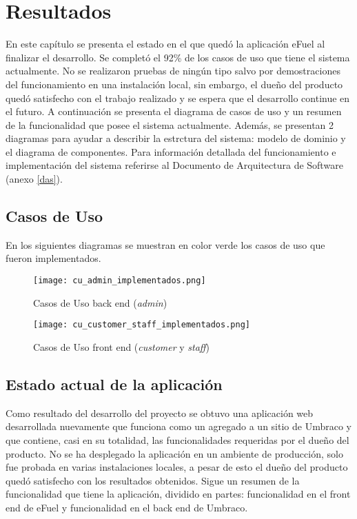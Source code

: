 \chapter{Resultados} \label{results}
En este capítulo se presenta el estado en el que quedó la aplicación eFuel al finalizar el desarrollo. Se completó el 92\% de los casos de uso que tiene el sistema actualmente. No se realizaron pruebas de ningún tipo salvo por demostraciones del funcionamiento en una instalación local, sin embargo, el dueño del producto quedó satisfecho con el trabajo realizado y se espera que el desarrollo continue en el futuro. A continuación se presenta el diagrama de casos de uso y un resumen de la funcionalidad que posee el sistema actualmente. Además, se presentan 2 diagramas para ayudar a describir la estrctura del sistema: modelo de dominio y el diagrama de componentes. Para información detallada del funcionamiento e implementación del sistema referirse al Documento de Arquitectura de Software (anexo \ref{das}).

\section{Casos de Uso} \label{useCases}
En los siguientes diagramas se muestran en color verde los casos de uso que fueron implementados.

\begin{figure}[H]
    \texttt{[image: cu\_admin\_implementados.png]}
    \caption{Casos de Uso back end (\emph{admin})}
    \label{fig:cu_admin_implementados}
    \centering
\end{figure}

\begin{figure}[H]
    \texttt{[image: cu\_customer\_staff\_implementados.png]}
    \caption{Casos de Uso front end (\emph{customer} y \emph{staff})}
    \label{fig:cu_customer_staff_implementados}
    \centering
\end{figure}

\section{Estado actual de la aplicación}
Como resultado del desarrollo del proyecto se obtuvo una aplicación web desarrollada nuevamente que funciona como un agregado a un sitio de Umbraco y que contiene, casi en su totalidad, las funcionalidades requeridas por el dueño del producto. No se ha desplegado la aplicación en un ambiente de producción, solo fue probada en varias instalaciones locales, a pesar de esto el dueño del producto quedó satisfecho con los resultados obtenidos. Sigue un resumen de la funcionalidad que tiene la aplicación, dividido en partes: funcionalidad en el front end de eFuel y funcionalidad en el back end de Umbraco.

